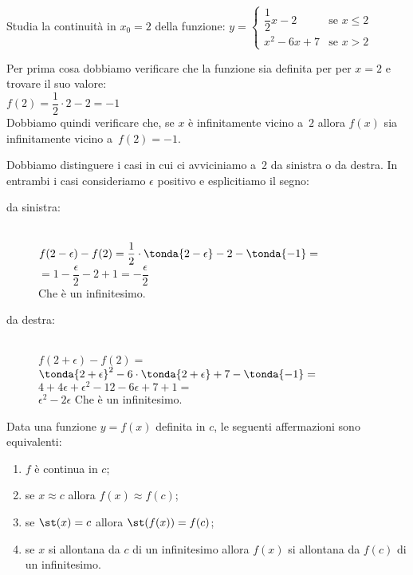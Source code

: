 \begin{esempio}
Studia la continuità in \(x_0=2\) della funzione: 
\(y=\begin{cases} 
    \dfrac{1}{2}x-2 & \text{se } x \leqslant 2 \\ 
    x^2-6x+7 & \text{se } x > 2
  \end{cases}\)

Per prima cosa dobbiamo verificare che la funzione sia definita per 
per \(x=2\) e trovare il suo valore:\\
\(f(2) = \dfrac{1}{2} \cdot 2-2 = -1\)\\
Dobbiamo quindi verificare che, se \(x\) è infinitamente vicino a~\(2\) 
allora \(f(x)\) sia infinitamente vicino a~\(f(2) = -1\).

Dobbiamo distinguere i casi in cui ci avviciniamo a~2 da sinistra o da 
destra. In entrambi i casi consideriamo \(\epsilon\) positivo e esplicitiamo 
il segno:

\begin{minipage}{.49\textwidth}
\begin{description}
 \item [da sinistra:]
 ~\\
\(f(2-\epsilon) - f(2) =
  \dfrac{1}{2} \cdot \tonda{2-\epsilon}-2-\tonda{-1} =\)\\
\(= 1 - \dfrac{\epsilon}{2} -2 +1 = -\dfrac{\epsilon}{2}\)\\ 
Che è un infinitesimo.
 \item [da destra:]
 ~\\
\(f(2+\epsilon) - f(2) =\)\\
\(\tonda{2+\epsilon}^2-6 \cdot \tonda{2+\epsilon}+7-\tonda{-1} =\)\\
\(4+4\epsilon+\epsilon^2-12-6 \epsilon+7+1 =\)\\
\(\epsilon^2-2 \epsilon\) \quad
Che è un infinitesimo.
\end{description}
\end{minipage}
\begin{minipage}{.49\textwidth}
\begin{center}\continuitagraficoa\end{center}
\end{minipage}

\end{esempio}

Data una funzione \(y=f(x)\) definita in \(c\), le seguenti 
affermazioni sono equivalenti:

\begin{enumerate}[noitemsep]
 \item \(f\) è continua in \(c\);
 \item se \(x \approx c\) allora \(f(x) \approx f(c)\);
 \item se \(\st(x) = c\) allora \(\st(f(x)) = f(c)\);
 \item se \(x\) si allontana da \(c\) di un infinitesimo allora 
   \(f(x)\) si allontana da \(f(c)\) di un infinitesimo.
\end{enumerate}

